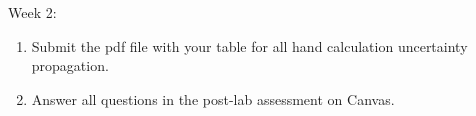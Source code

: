 \documentclass{article} %
\begin{document}
Week 2:
\begin{enumerate}
    \item Submit the pdf file with your table for all hand calculation uncertainty propagation.
    \item Answer all questions in the post-lab assessment on Canvas.
\end{enumerate}

\end{document}
